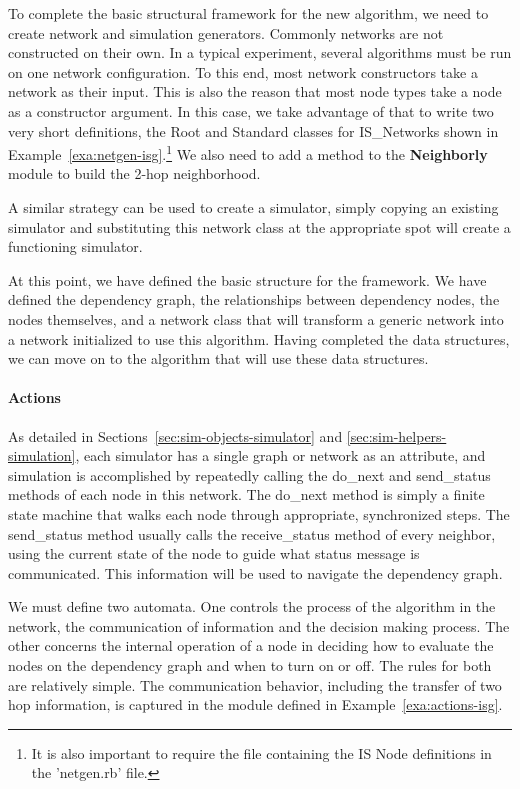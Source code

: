 To complete the basic structural framework for the new algorithm, we need to create network and simulation generators. Commonly networks are not constructed on their own. In a typical experiment, several algorithms must be run on one network configuration. To this end, most network constructors take a network as their input. This is also the reason that most node types take a node as a constructor argument. In this case, we take advantage of that to write two very short definitions, the Root and Standard classes for IS\_Networks shown in Example~\ref{exa:netgen-isg}.\footnote{It is also important to require the file containing the IS Node definitions in the 'netgen.rb' file.} We also need to add a method to the {\bf Neighborly} module to build the 2-hop neighborhood.

 A similar strategy can be used to create a simulator, simply copying an existing simulator and substituting this network class at the appropriate spot will create a functioning simulator.

At this point, we have defined the basic structure for the framework. We have defined the dependency graph, the relationships between dependency nodes, the nodes themselves, and a network class that will transform a generic network into a network initialized to use this algorithm. Having completed the data structures, we can move on to the algorithm that will use these data structures. 



\paragraph{Actions}
As detailed in Sections~\ref{sec:sim-objects-simulator} and \ref{sec:sim-helpers-simulation}, each simulator has a single graph or network as an attribute, and simulation is accomplished by repeatedly calling the {\ttfamily do\_next} and {\ttfamily send\_status} methods of each node in this network. The {\ttfamily do\_next} method is simply a finite state machine that walks each node through appropriate, synchronized steps. The {send\_status} method usually calls the {\ttfamily receive\_status} method of every neighbor, using the current state of the node to guide what status message is communicated. This information will be used to navigate the dependency graph. 

We must define two automata. One controls the process of the algorithm in the network, the communication of information and the decision making process. The other concerns the internal operation of a node in deciding how to evaluate the nodes on the dependency graph and when to turn on or off. The rules for both are relatively simple. The communication behavior, including the transfer of two hop information, is captured in the module defined in Example~\ref{exa:actions-isg}.  


